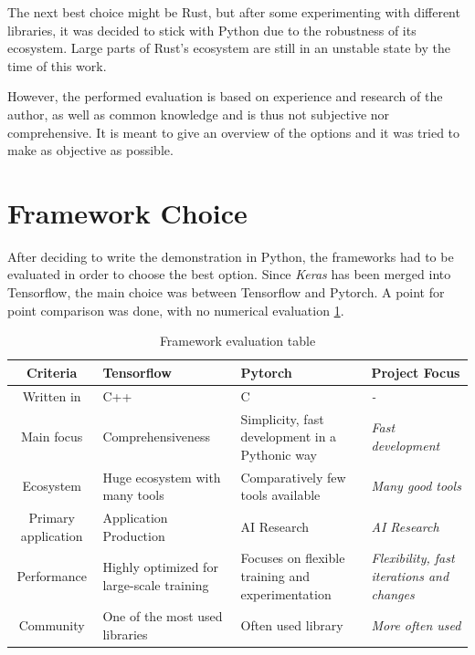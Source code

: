 \documentclass[12pt, a4paper, titlepage]{report}
\begin{document}
The next best choice might be Rust, but after some experimenting with different libraries, it was decided to stick with Python due to the robustness of its ecosystem. Large parts of Rust's ecosystem are still in an unstable state by the time of this work.

However, the performed evaluation is based on experience and research of the author, as well as common knowledge and is thus not subjective nor comprehensive. It is meant to give an overview of the options and it was tried to make as objective as possible.


\section{Framework Choice}

After deciding to write the demonstration in Python, the frameworks had to be evaluated in order to choose the best option. Since \emph{Keras} has been merged into Tensorflow, the main choice was between Tensorflow and Pytorch.
A point for point comparison was done, with no numerical evaluation \ref{table:framework_evaluation}.

\begin{table}
   \begin{tabular} {|c||p{4.0cm}|p{4.0cm}||p{3.0cm}|}
      \hline
      \textbf{Criteria}          & \textbf{Tensorflow} & \textbf{Pytorch} & \textbf{Project Focus} \\
      \hline
      Written in           & C++ & C & \emph{-} \\ \hline
      Main focus           & Comprehensiveness & Simplicity, fast development in a Pythonic way & \emph{Fast development} \\ \hline
      Ecosystem            & Huge ecosystem with many tools & Comparatively few tools available & \emph{Many good tools} \\ \hline
      Primary application  & Application Production & AI Research & \emph{AI Research} \\ \hline
      Performance          & Highly optimized for large-scale training & Focuses on flexible training and experimentation & \emph{Flexibility, fast iterations and changes} \\ \hline
      Community            & One of the most used libraries & Often used library & \emph{More often used} \\ \hline
      \hline
   \end{tabular}
   \caption{Framework evaluation table}
   \label{table:framework_evaluation}
\end{table}
\end{document}
